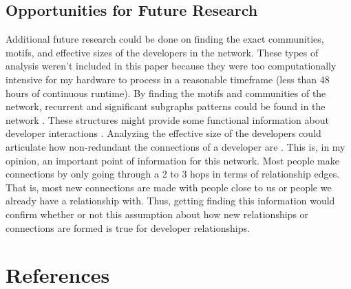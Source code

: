 \documentclass[9pt,twocolumn,twoside]{pnas-new}
\begin{document}
\subsection{Opportunities for Future Research} Additional future research could be done on finding the exact communities, motifs, and effective sizes of the developers in the network. These types of analysis weren't included in this paper because they were too computationally intensive for my hardware to process in a reasonable timeframe (less than 48 hours of continuous runtime). By finding the motifs and communities of the network, recurrent and significant subgraphs patterns could be found in the network \cite{wikipediamotif}. These structures might provide some functional information about developer interactions \cite{wikipediamotif}. Analyzing the effective size of the developers could articulate how non-redundant the connections of a developer are \cite{networkxeffectivesize}. This is, in my opinion, an important point of information for this network. Most people make connections by only going through a 2 to 3 hops in terms of relationship edges. That is, most new connections are made with people close to us or people we already have a relationship with. Thus, getting finding this information would confirm whether or not this assumption about how new relationships or connections are formed is true for developer relationships. 


\showacknow{}

\section{References}


\end{document}
